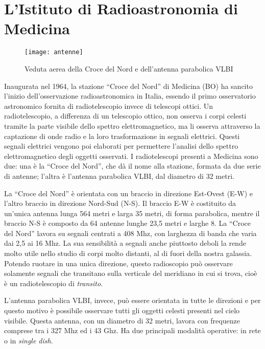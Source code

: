 \section*{L'Istituto di Radioastronomia di Medicina}
\begin{figure}[htb]
	\begin{center}
		\texttt{[image: antenne]}
	\end{center}
	\caption{Veduta aerea della Croce del Nord e dell'antenna parabolica VLBI}
	\label{fig:rtscopes}
\end{figure}
Inaugurata nel 1964, la stazione ``Croce del Nord'' di Medicina (BO) ha sancito
l'inizio dell'osservazione radioastronomica in Italia, essendo il primo
osservatorio astronomico fornita di radiotelescopio invece di telescopi ottici.
Un radiotelescopio, a differenza di un telescopio ottico, non osserva i corpi
celesti tramite la parte visibile dello spettro elettromagnetico, ma li osserva
attraverso la captazione di onde radio e la loro trasformazione in segnali
elettrici. Questi segnali elettrici vengono poi elaborati per permettere
l'analisi dello spettro elettromagnetico degli oggetti osservati. I
radiotelescopi presenti a Medicina sono due: una \`e la ``Croce del Nord'', che
d\`a il nome alla stazione, formata da due serie di antenne; l'altra \`e
l'antenna parabolica \ac{VLBI}, dal diametro di 32 metri.

La ``Croce del Nord'' \`e orientata con un braccio in direzione Est-Ovest (E-W)
e l'altro braccio in direzione Nord-Sud (N-S). Il braccio E-W \`e costituito da
un'unica antenna lunga 564 metri e larga 35 metri, di forma parabolica, mentre
il braccio N-S \`e composto da 64 antenne lunghe 23,5 metri e larghe 8. La
``Croce del Nord'' lavora su segnali centrati a 408 Mhz, con larghezza di banda
che varia dai 2,5 ai 16 Mhz. La sua sensibilit\`a a segnali anche piuttosto
deboli la rende molto utile nello studio di corpi molto distanti, al di fuori
della nostra galassia. Potendo ruotare in una unica direzione, questo
radioscopio pu\`o osservare solamente segnali che transitano sulla verticale del
meridiano in cui si trova, cio\`e \`e un radiotelescopio di \emph{transito}.

L'antenna parabolica \ac{VLBI}, invece, pu\`o essere orientata in tutte le
direzioni e per questo motivo \`e possibile osservare tutti gli oggetti celesti
presenti nel cielo visibile. Questa antenna, con un diametro di 32 metri, lavora
con frequenze comprese tra i 327 Mhz ed i 43 Ghz. Ha due principali modalit\`a
operative: in rete o in \emph{single dish}.

